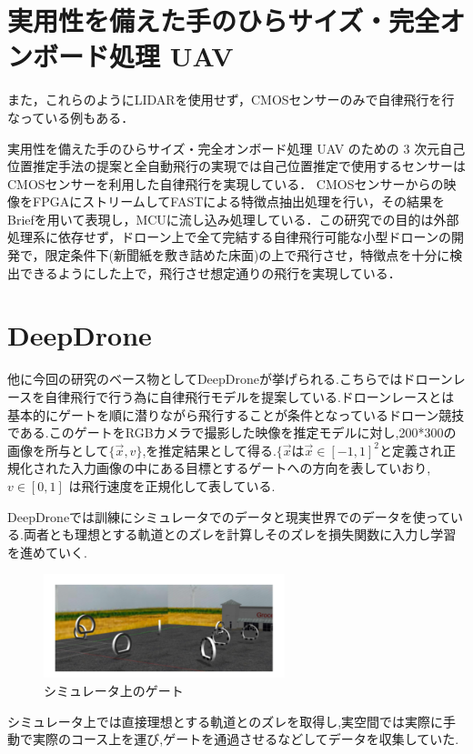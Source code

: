 \section{実用性を備えた手のひらサイズ・完全オンボード処理 UAV}
また，これらのようにLIDARを使用せず，CMOSセンサーのみで自律飛行を行なっている例もある．

実用性を備えた手のひらサイズ・完全オンボード処理 UAV のための 3 次元自己位置推定手法の提案と全自動飛行の実現\cite{SfMDrone}では自己位置推定で使用するセンサーはCMOSセンサーを利用した自律飛行を実現している．
CMOSセンサーからの映像をFPGAにストリームしてFAST\cite{FAST}による特徴点抽出処理を行い，その結果をBrief\cite{Brief}を用いて表現し，MCUに流し込み処理している．この研究での目的は外部処理系に依存せず，ドローン上で全て完結する自律飛行可能な小型ドローンの開発で，限定条件下(新聞紙を敷き詰めた床面)の上で飛行させ，特徴点を十分に検出できるようにした上で，飛行させ想定通りの飛行を実現している．

\section{DeepDrone}
他に今回の研究のベース物としてDeepDrone\cite{DeepDrone}が挙げられる.こちらではドローンレースを自律飛行で行う為に自律飛行モデルを提案している.ドローンレースとは基本的にゲートを順に潜りながら飛行することが条件となっているドローン競技である.このゲートをRGBカメラで撮影した映像を推定モデルに対し,200*300の画像を所与として$\lbrace \vec{x}, v \rbrace$,を推定結果として得る.$\lbrace \vec{x}$は$\vec{x} \in [-1,1]^2$と定義され正規化された入力画像の中にある目標とするゲートへの方向を表していおり, $v \in [0,1]$ は飛行速度を正規化して表している. 

DeepDroneでは訓練にシミュレータでのデータと現実世界でのデータを使っている.両者とも理想とする軌道とのズレを計算しそのズレを損失関数に入力し学習を進めていく.
\begin{figure}[htbp]
  \begin{center}
    \includegraphics[clip,width=7.0cm]{img/deep-simu.png}
    \caption{シミュレータ上のゲート}
    \label{fig:gate}
  \end{center}
\end{figure}
シミュレータ上では直接理想とする軌道とのズレを取得し,実空間では実際に手動で実際のコース上を運び,ゲートを通過させるなどしてデータを収集していた.

